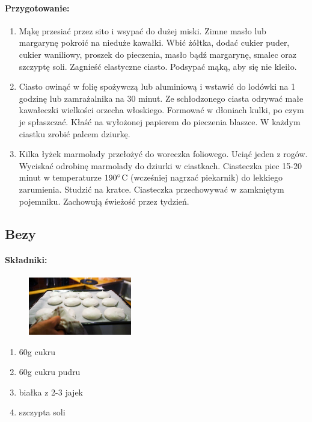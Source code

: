 \documentclass{article}
\begin{document}
    \paragraph{Przygotowanie:}
    \begin{enumerate}
        \item Mąkę przesiać przez sito i wsypać do dużej miski. Zimne masło lub
            margarynę pokroić na nieduże kawałki. Wbić żółtka, dodać cukier
            puder, cukier waniliowy, proszek do pieczenia, masło bądź margarynę,
            smalec oraz szczyptę soli. Zagnieść elastyczne ciasto. Podsypać
            mąką, aby się nie kleiło.
        \item Ciasto owinąć w folię spożywczą lub aluminiową i wstawić do
            lodówki na 1 godzinę lub zamrażalnika na 30 minut. Ze schłodzonego
            ciasta odrywać małe kawałeczki wielkości orzecha włoskiego. Formować
            w dłoniach kulki, po czym je spłaszczać. Kłaść na wyłożonej papierem
            do pieczenia blaszce. W każdym ciastku zrobić palcem dziurkę.
        \item Kilka łyżek marmolady przełożyć do woreczka foliowego. Uciąć jeden
            z rogów. Wyciskać odrobinę marmolady do dziurki w ciastkach.
            Ciasteczka piec 15-20 minut w temperaturze $190\degree$C (wcześniej
            nagrzać piekarnik) do lekkiego zarumienia. Studzić na kratce.
            Ciasteczka przechowywać w zamkniętym pojemniku. Zachowują świeżość
            przez
            tydzień.
    \end{enumerate}
    \newpage


    \subsection{Bezy}
    \bigskip
    \paragraph{Składniki:}
    \begin{figure}
        \includegraphics[width=0.4\textwidth]{bezy.jpg}
    \end{figure}
    \begin{enumerate}
        \item 60g cukru
        \item 60g cukru pudru
        \item białka z 2-3 jajek
        \item szczypta soli
    \end{enumerate}
\end{document}

